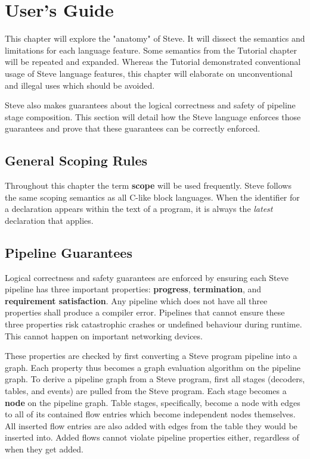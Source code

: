 \chapter{User's Guide} \label{users_guide}

This chapter will explore the "anatomy" of Steve. It will dissect the semantics and limitations for each language feature. Some semantics from the Tutorial chapter will be repeated and expanded. Whereas the Tutorial demonstrated conventional usage of Steve language features, this chapter will elaborate on unconventional and illegal uses which should be avoided.

Steve also makes guarantees about the logical correctness and safety of pipeline stage composition. This section will detail how the Steve language enforces those guarantees and prove that these guarantees can be correctly enforced.

\section{General Scoping Rules} \label{scope_guide}

Throughout this chapter the term \textbf{scope} will be used frequently. Steve follows the same scoping semantics as all C-like block languages. When the identifier for a declaration appears within the text of a program, it is always the \textit{latest} declaration that applies.

\section{Pipeline Guarantees} \label{pipeline_guide}

Logical correctness and safety guarantees are enforced by ensuring each Steve pipeline has three important properties: \textbf{progress}, \textbf{termination}, and \textbf{requirement satisfaction}. Any pipeline which does not have all three properties shall produce a compiler error. Pipelines that cannot ensure these three properties risk catastrophic crashes or undefined behaviour during runtime. This cannot happen on important networking devices.

These properties are checked by first converting a Steve program pipeline into a graph. Each property thus becomes a graph evaluation algorithm on the pipeline graph. To derive a pipeline graph from a Steve program, first all stages (decoders, tables, and events) are pulled from the Steve program. Each stage becomes a \textbf{node} on the pipeline graph. Table stages, specifically, become a node with edges to all of its contained flow entries which become independent nodes themselves. All inserted flow entries are also added with edges from the table they would be inserted into. Added flows cannot violate pipeline properties either, regardless of when they get added.

